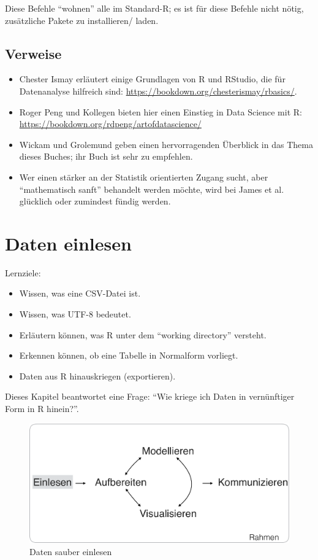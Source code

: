 \documentclass[12pt,ngerman,]{book}
\providecommand{\tightlist}{%
  \setlength{\itemsep}{0pt}\setlength{\parskip}{0pt}}
\let\BeginKnitrBlock\begin \let\EndKnitrBlock\end
\begin{document}
Diese Befehle ``wohnen'' alle im Standard-R; es ist für diese Befehle
nicht nötig, zusätzliche Pakete zu installieren/ laden.

\section{Verweise}\label{verweise}

\begin{itemize}
\item
  Chester Ismay erläutert einige Grundlagen von R und RStudio, die für
  Datenanalyse hilfreich sind:
  \url{https://bookdown.org/chesterismay/rbasics/}.
\item
  Roger Peng und Kollegen bieten hier einen Einstieg in Data Science mit
  R: \url{https://bookdown.org/rdpeng/artofdatascience/}
\item
  Wickam und Grolemund \citeyearpar{r4ds} geben einen hervorragenden
  Überblick in das Thema dieses Buches; ihr Buch ist sehr zu empfehlen.
\item
  Wer einen stärker an der Statistik orientierten Zugang sucht, aber
  ``mathematisch sanft'' behandelt werden möchte, wird bei James et al.
  \citeyearpar{introstatlearning} glücklich oder zumindest fündig
  werden.
\end{itemize}

\chapter{Daten einlesen}\label{daten-einlesen}

\BeginKnitrBlock{rmdcaution}
Lernziele:

\begin{itemize}
\tightlist
\item
  Wissen, was eine CSV-Datei ist.
\item
  Wissen, was UTF-8 bedeutet.
\item
  Erläutern können, was R unter dem ``working directory'' versteht.
\item
  Erkennen können, ob eine Tabelle in Normalform vorliegt.
\item
  Daten aus R hinauskriegen (exportieren).
\end{itemize}
\EndKnitrBlock{rmdcaution}

Dieses Kapitel beantwortet eine Frage: ``Wie kriege ich Daten in
vernünftiger Form in R hinein?''.

\begin{figure}

{\centering \includegraphics[width=0.7\linewidth]{images/Einlesen} 

}

\caption{Daten sauber einlesen}\label{fig:step-Einlesen}
\end{figure}
\end{document}
